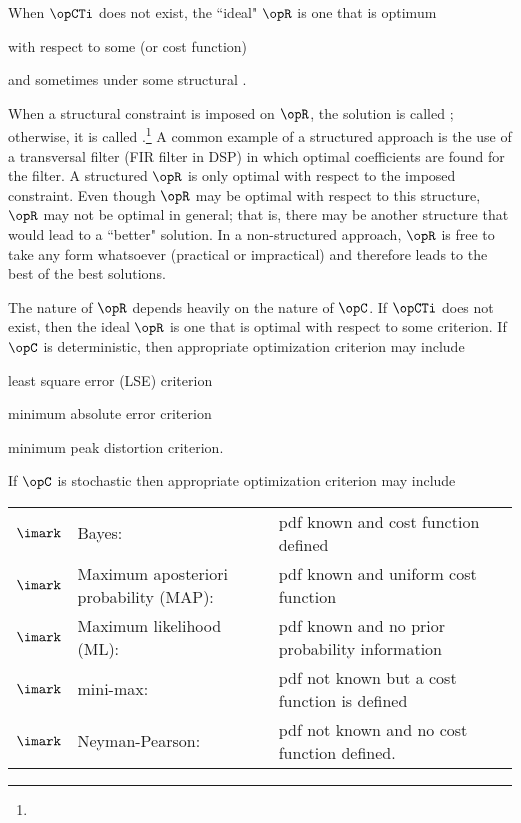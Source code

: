 When $\opCTi$ does not exist, the ``ideal" $\opR$ is one that is
optimum
  \begin{enume}
    \item with respect to some  (or cost function)
    \item and sometimes under some structural .
  \end{enume}
When a structural constraint is imposed on $\opR$,
the solution is called ; otherwise,
it is called .\footnote{}
A common example of a structured approach is the use of a
transversal filter (FIR filter in DSP) in which optimal coefficients
are found for the filter.
A structured $\opR$ is only optimal with respect to the
imposed constraint.
Even though $\opR$ may be optimal with respect to this structure,
$\opR$ may not be optimal in general;
that is, there may be another structure that would lead to a ``better"
solution.
In a non-structured approach, $\opR$ is free to take any form
whatsoever (practical or impractical) and therefore leads to the
best of the best solutions.

The nature of $\opR$ depends heavily on the nature of $\opC$.
If $\opCTi$ does not exist,
then the ideal $\opR$ is one that is optimal with respect to some criterion.
If $\opC$ is deterministic,
then appropriate optimization criterion may include
\begin{liste}
   \item least square error (LSE) criterion
   \item minimum absolute error criterion
   \item minimum peak distortion criterion.
\end{liste}
If $\opC$ is stochastic
then appropriate optimization criterion may include
\\\begin{tabular}{clll}
     $\imark$ & Bayes:                                  & pdf known and cost function defined
   \\$\imark$ & Maximum aposteriori probability (MAP):  & pdf known and uniform cost function
   \\$\imark$ & Maximum likelihood (ML):                & pdf known and no prior probability information
   \\$\imark$ & mini-max:                               & pdf not known but a cost function is defined
   \\$\imark$ & Neyman-Pearson:                         & pdf not known and no cost function defined.
\end{tabular}

